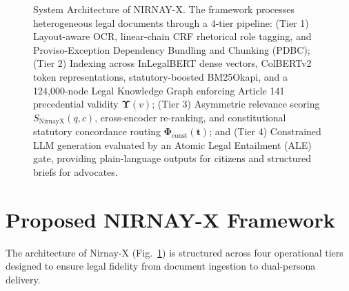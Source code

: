 \documentclass[conference]{IEEEtran}
\begin{document}
\begin{figure}[!t]
\caption{System Architecture of NIRNAY-X. The framework processes heterogeneous legal documents through a 4-tier pipeline: (Tier 1) Layout-aware OCR, linear-chain CRF rhetorical role tagging, and Proviso-Exception Dependency Bundling and Chunking (PDBC); (Tier 2) Indexing across InLegalBERT dense vectors, ColBERTv2 token representations, statutory-boosted BM25Okapi, and a 124,000-node Legal Knowledge Graph enforcing Article 141 precedential validity $\mathbf{\Upsilon}(v)$; (Tier 3) Asymmetric relevance scoring $S_{\text{NirnayX}}(q, c)$, cross-encoder re-ranking, and constitutional statutory concordance routing $\mathbf{\Phi}_{\text{const}}(\mathbf{t})$; and (Tier 4) Constrained LLM generation evaluated by an Atomic Legal Entailment (ALE) gate, providing plain-language outputs for citizens and structured briefs for advocates.}
\label{fig:architecture}
\end{figure}

\section{Proposed NIRNAY-X Framework}
The architecture of Nirnay-X (Fig.~\ref{fig:architecture}) is structured across four operational tiers designed to ensure legal fidelity from document ingestion to dual-persona delivery.
\end{document}
